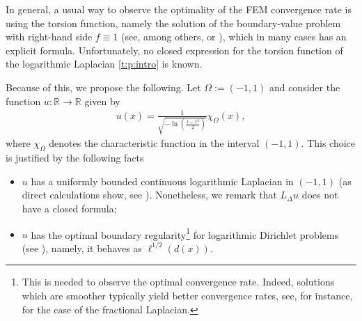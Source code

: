 \documentclass[11 pt]{article}
\numberwithin{equation}{section}
\def\R{\mathbb{R}}
\begin{document}
In general, a usual way to observe the optimality of the FEM convergence rate is using the torsion function, namely the solution of the boundary-value problem with right-hand side $f\equiv 1$ (see, among others, \cite[Section 5]{AB17} or \cite[Section 5]{BHS19}), which in many cases has an explicit formula. Unfortunately, no closed expression for the torsion function of the logarithmic Laplacian \eqref{t:p:intro} is known.

Because of this, we propose the following. Let $\Omega:=(-1,1)$ and consider the function $u:\R\to\R$ given by
\begin{align}\label{udef}
 u(x)=\frac{1}{\sqrt{-\ln\left(\frac{1-x^2}{2}\right)}} \chi_{\Omega}(x),
\end{align}
where $\chi_{\Omega}$ denotes the characteristic function in the interval $(-1,1)$.  This choice is justified by the following facts
\begin{itemize}
 \item $u$ has a uniformly bounded continuous logarithmic Laplacian in $(-1,1)$ (as direct calculations show, see \cite[Theorem 2.4]{HSLRS23}). Nonetheless, we remark that $L_{\Delta} u$ does not have a closed formula;
 \item $u$ has the optimal boundary regularity\footnote{This is needed to observe the optimal convergence rate. Indeed, solutions which are smoother typically yield better convergence rates, see, for instance, \cite[Section 5 and Table 2]{AB17} for the case of the fractional Laplacian.} for logarithmic Dirichlet problems (see \cite[Theorem 1.2]{HSLRS23}), namely, it behaves as $\ell^{1/2}(d(x))$.
\end{itemize}

%
%
%
%
%
\end{document}
